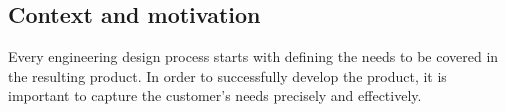 


    \subsection*{Context and motivation}
    Every engineering design process starts with defining the needs to be covered in the resulting product. In order to successfully develop the product, it is important to capture the customer's needs precisely and effectively. 


